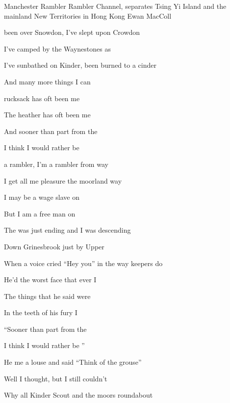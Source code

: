\begin{SBSong}{Manchester Rambler}
    {Rambler Channel, separates Tsing Yi Island and the mainland New Territories in Hong Kong}
    {Ewan MacColl}
  \begin{SBVerse}
	 been over Snowdon, I've slept upon Crowdon
	
	I've camped by the Waynestones as 
	
	I've sunbathed on Kinder, been burned to a cinder
	
	And many more things I can 
	
	 rucksack has oft been me 
	
	The heather has oft been me 
	
	And sooner than part from the 
	
	I think I would rather be  
  \end{SBVerse}
  \begin{SBChorus}
	 a rambler, I'm a rambler from  way
	
	I get all me pleasure the  moorland way
	
	I may be a wage slave on
	
	But I am a free man on  
  \end{SBChorus}
  \begin{SBVerse}
	The  was just ending and I was descending
	
	Down Grinesbrook just by Upper 
	
	When a voice cried ``Hey you'' in the way keepers do
	
	He'd the worst face that ever I 
	
	The things that he said were 
	
	In the teeth of his fury I 
	
	``Sooner than part from the 
	
	I think I would rather be ''
  \end{SBVerse}
  \CBPageBrk
  \begin{SBVerse}
	He  me a louse and said ``Think of the grouse''
	
	Well I thought, but I still couldn't 
	
	Why all Kinder Scout and the moors roundabout
	

\end{SBVerse}
\end{SBSong}
